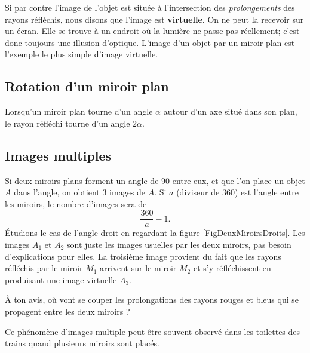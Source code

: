 \documentclass[a4paper,12pt]{book}
\theoremstyle{mes_exemples}	\newtheorem{exemple}[numtho]{Exemple}
\theoremstyle{mes_tho}
\newcommand{\defe}[2]{\textbf{#1}\index{#2}}
\begin{document}
Si par contre l'image de l'objet est située à l'intersection des \emph{prolongements} des rayons réfléchis, nous disons que l'image est \defe{virtuelle}{Image!virtuelle}. On ne peut la recevoir sur un écran. Elle se trouve à un endroit où la lumière ne passe pas réellement; c'est donc toujours une illusion d'optique. L'image d'un objet par un miroir plan est l'exemple le plus simple d'image virtuelle.

\subsection{Rotation d'un miroir plan}

Lorsqu'un miroir plan tourne d'un angle $\alpha$ autour d'un axe situé dans son plan, le rayon réfléchi tourne d'un angle $2\alpha$.

\subsection{Images multiples}

Si deux miroirs plans forment un angle de \unit{90}{\degree} entre eux, et que l'on place un objet $A$ dans l'angle, on obtient 3 images de $A$. Si $a$ (diviseur de \unit{360}{\degree}) est l'angle entre les miroirs, le nombre d'images sera de
\[ 
  \frac{ 360 }{ a }-1.
\]
Étudions le cas de l'angle droit en regardant la figure \ref{FigDeuxMiroirsDroits}. Les images $A_{1}$ et $A_{2}$ sont juste les images usuelles par les deux miroirs, pas besoin d'explications pour elles. La troisième image provient du fait que les rayons réfléchis par le miroir $M_{1}$ arrivent sur le miroir $M_{2}$ et s'y réfléchissent en produisant une image virtuelle $A_{3}$.

À ton avis, où vont se couper les prolongations des rayons rouges et bleus qui se propagent entre les deux miroirs ?

Ce phénomène d'images multiple peut être souvent observé dans les toilettes des trains quand plusieurs miroirs sont placés.
\end{document}
